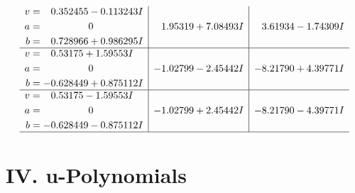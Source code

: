 \documentclass[1p]{elsarticle_modified}
\theoremstyle{definition}
\begin{document}
$$\begin{array}{c|c|c}
\begin{aligned}
v &= \phantom{-}0.352455 - 0.113243 I \\
a &= \phantom{-0.000000 } 0 \\
b &= \phantom{-}0.728966 + 0.986295 I\end{aligned}
 & \phantom{-}1.95319 + 7.08493 I & \phantom{-}3.61934 - 1.74309 I \\ \hline\begin{aligned}
v &= \phantom{-}0.53175 + 1.59553 I \\
a &= \phantom{-0.000000 } 0 \\
b &= -0.628449 + 0.875112 I\end{aligned}
 & -1.02799 - 2.45442 I & -8.21790 + 4.39771 I \\ \hline\begin{aligned}
v &= \phantom{-}0.53175 - 1.59553 I \\
a &= \phantom{-0.000000 } 0 \\
b &= -0.628449 - 0.875112 I\end{aligned}
 & -1.02799 + 2.45442 I & -8.21790 - 4.39771 I\\
 \hline 
 \end{array}$$\newpage
\newpage\renewcommand{\arraystretch}{1}
\centering \section*{ IV. u-Polynomials}
\end{document}
